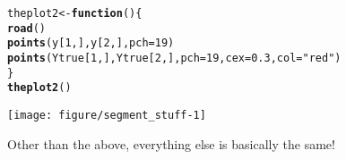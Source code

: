 \documentclass[11pt]{article}\usepackage[]{graphicx}\usepackage[]{color}
\makeatletter
\def\maxwidth{ %
  \ifdim\Gin@nat@width>\linewidth
    \linewidth
  \else
    \Gin@nat@width
  \fi
}
\newcommand{\hlnum}[1]{\textcolor[rgb]{0.686,0.059,0.569}{#1}}%
\newcommand{\hlstr}[1]{\textcolor[rgb]{0.192,0.494,0.8}{#1}}%
\newcommand{\hlstd}[1]{\textcolor[rgb]{0.345,0.345,0.345}{#1}}%
\newcommand{\hlkwa}[1]{\textcolor[rgb]{0.161,0.373,0.58}{\textbf{#1}}}%
\newcommand{\hlkwb}[1]{\textcolor[rgb]{0.69,0.353,0.396}{#1}}%
\newcommand{\hlkwc}[1]{\textcolor[rgb]{0.333,0.667,0.333}{#1}}%
\newcommand{\hlkwd}[1]{\textcolor[rgb]{0.737,0.353,0.396}{\textbf{#1}}}%
\newenvironment{kframe}{%
 \def\at@end@of@kframe{}%
 \ifinner\ifhmode%
  \def\at@end@of@kframe{\end{minipage}}%
  \begin{minipage}{\columnwidth}%
 \fi\fi%
 \def\FrameCommand##1{\hskip\@totalleftmargin \hskip-\fboxsep
 \colorbox{shadecolor}{##1}\hskip-\fboxsep
     \hskip-\linewidth \hskip-\@totalleftmargin \hskip\columnwidth}%
 \MakeFramed {\advance\hsize-\width
   \@totalleftmargin\z@ \linewidth\hsize
   \@setminipage}}%
 {\par\unskip\endMakeFramed%
 \at@end@of@kframe}
\newenvironment{knitrout}{}{} %
\makeatother
\begin{document}
\begin{knitrout}
\begin{kframe}
\begin{alltt}
\hlstd{theplot2} \hlkwb{<-} \hlkwa{function}\hlstd{() \{}
    \hlkwd{road}\hlstd{()}
    \hlkwd{points}\hlstd{(y[}\hlnum{1}\hlstd{, ], y[}\hlnum{2}\hlstd{, ],} \hlkwc{pch} \hlstd{=} \hlnum{19}\hlstd{)}
    \hlkwd{points}\hlstd{(Ytrue[}\hlnum{1}\hlstd{, ], Ytrue[}\hlnum{2}\hlstd{, ],} \hlkwc{pch} \hlstd{=} \hlnum{19}\hlstd{,} \hlkwc{cex} \hlstd{=} \hlnum{0.3}\hlstd{,} \hlkwc{col} \hlstd{=} \hlstr{"red"}\hlstd{)}
\hlstd{\}}
\hlkwd{theplot2}\hlstd{()}
\end{alltt}
\end{kframe}

{\centering \texttt{[image: figure/segment\_stuff-1]} 

}



\end{knitrout}

Other than the above, everything else is basically the same!
\end{document}
